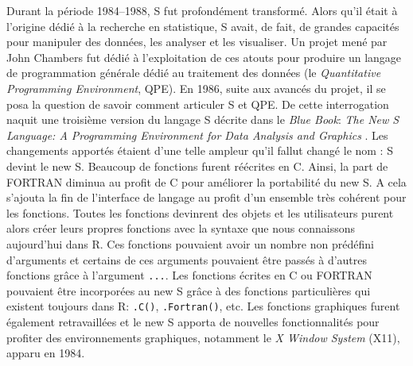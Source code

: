 \documentclass[]{article}
\begin{document}
Durant la période 1984--1988, S fut profondément transformé. Alors qu'il était à l'origine dédié à la recherche en statistique, S avait, de fait, de grandes capacités pour manipuler des données, les analyser et les visualiser. Un projet mené par John Chambers fut dédié à l'exploitation de ces atouts pour produire un langage de programmation générale dédié au traitement des données (le \emph{Quantitative Programming Environment}, QPE). En 1986, suite aux avancés du projet, il se posa la question de savoir comment articuler S et QPE. De cette interrogation naquit une troisième version du langage S décrite dans le \emph{Blue Book}: \emph{The New S Language: A Programming Environment for Data Analysis and Graphics} \citep{becker_new_1988}. Les changements apportés étaient d'une telle ampleur qu'il fallut changé le nom : S devint le new S. Beaucoup de fonctions furent réécrites en C. Ainsi, la part de FORTRAN diminua au profit de C pour améliorer la portabilité du new S. A cela s'ajouta la fin de l'interface de langage au profit d'un ensemble très cohérent pour les fonctions. Toutes les fonctions devinrent des objets et les utilisateurs purent alors créer leurs propres fonctions avec la syntaxe que nous connaissons aujourd'hui dans R. Ces fonctions pouvaient avoir un nombre non prédéfini d'arguments et certains de ces arguments pouvaient être passés à d'autres fonctions grâce à l'argument \texttt{...}. Les fonctions écrites en C ou FORTRAN pouvaient être incorporées au new S grâce à des fonctions particulières qui existent toujours dans R: \texttt{.C()}, \texttt{.Fortran()}, etc. Les fonctions graphiques furent également retravaillées et le new S apporta de nouvelles fonctionnalités pour profiter des environnements graphiques, notamment le \emph{X Window System} (X11), apparu en 1984.
\end{document}
